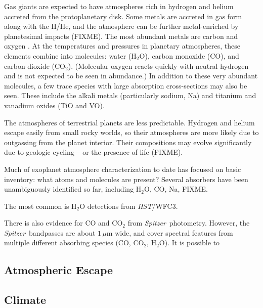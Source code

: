 \documentclass[graybox,natbib,nosecnum]{svmult}
\newcommand{\project}[1]{\textsl{#1}}
\newcommand{\HST}{\project{HST}}
\newcommand{\Spitzer}{\project{Spitzer}}
\begin{document}
Gas giants are expected to have atmospheres rich in hydrogen and helium accreted from the protoplanetary disk.  Some metals are accreted in gas form along with the H/He, and the atmosphere can be further metal-enriched by planetesimal impacts (FIXME). The most abundant metals are carbon and oxygen \citep{anders89}.  At the temperatures and pressures in planetary atmospheres, these elements combine into molecules: water (H$_2$O), carbon monoxide (CO), and carbon dioxide (CO$_2$).  (Molecular oxygen reacts quickly with neutral hydrogen and is not expected to be seen in abundance.) In addition to these very abundant molecules, a few trace species with large absorption cross-sections may also be seen. These include the alkali metals (particularly sodium, Na) and titanium and vanadium oxides (TiO and VO).  

The atmospheres of terrestrial planets are less predictable. Hydrogen and helium escape easily from small rocky worlds, so their atmospheres are more likely due to outgassing from the planet interior. Their compositions may evolve significantly due to geologic cycling -- or the presence of life (FIXME). 

Much of exoplanet atmosphere characterization to date has focused on basic inventory: what atoms and molecules are present?  Several absorbers have been unambiguously identified so far, including H$_2$O, CO, Na, FIXME. 

The most common is H$_2$O detections from \HST/WFC3.

There is also evidence for CO and CO$_2$ from \Spitzer\ photometry. However, the \Spitzer\ bandpasses are about $1\,\mu$m wide, and cover spectral features from multiple different absorbing species (CO, CO$_2$, H$_2$O). It is possible to   




\subsection{Atmospheric Escape}
\subsection{Climate}
\end{document}
